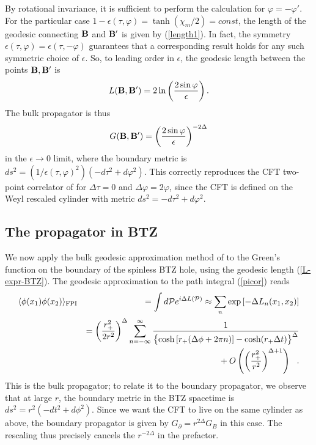 \documentclass[a4paper,12pt]{article}
\begin{document}
By rotational invariance, it is sufficient to perform the calculation
for $\varphi = - \varphi'$.  For the particular case $1 -
\epsilon(\tau,\varphi) = \tanh(\chi_m/2) = const$, the length of the
geodesic connecting ${\bf B}$ and ${\bf B}'$ is given by
(\ref{length1}).  In fact, the symmetry $\epsilon(\tau,\varphi) =
\epsilon(\tau,-\varphi)$ guarantees that a corresponding result holds
for any such symmetric choice of $\epsilon$.  So, to leading order in
$\epsilon$, the geodesic length between the points ${\bf B, B'}$ is
% 
\begin{equation} 
L({\bf B},{\bf B'}) = 2 \ln\left(2\sin\varphi \over \epsilon \right).
\label{geodlen} 
\end{equation} 
% 
The bulk propagator is thus
% 
\begin{equation} 
G({\bf B},{\bf B'}) = \left(2 \sin\varphi \over
\epsilon \right)^{-2\Delta}
\label{eqt2} 
\end{equation} 
% 
in the $\epsilon \rightarrow 0$ limit, where the boundary metric is
$ds^2 = (1/\epsilon(\tau,\varphi)^2) ( -d\tau^2 + d\varphi^2)$.  This
correctly reproduces the CFT two-point correlator of \cite{witten} for
$\Delta \tau=0$ and $\Delta \varphi = 2\varphi$, since the CFT is
defined on the Weyl rescaled cylinder with metric $ds^2 = -d\tau^2 +
d\varphi^2$.  

\subsection{The propagator in BTZ}
\label{prop-in-BTZ}

We now apply the bulk geodesic approximation method of \cite{holopart}
to the Green's function on the boundary of the spinless BTZ hole,
using the geodesic length (\ref{L-expr-BTZ}). The geodesic
approximation to the path integral (\ref{picor}) reads
\begin{eqnarray}
\langle \phi (x_1) \phi(x_2) \rangle_{\rm FPI} 
&&= \int d{\cal P} e^{i
\Delta L({\cal P})}
\approx 
\sum_n\exp\left[-\Delta L_n(x_1,x_2)\right]
\nonumber
\\
&&=
\left(\frac{r_+^2}{2 r^2} \right)^\Delta
\sum_{n=-\infty}^{\infty} 
\frac{1}
{
\left\{
\cosh \left[r_+(\Delta \phi+ 2\pi n) \right] - 
\cosh(r_+\Delta t )
\vphantom{A^A_A}
\right\}^\Delta
}
\nonumber
\\
&&
\phantom{xx}
+ 
O\left( \left( \frac{r_+^2}
{r^2} \right)^{\Delta+1}
\right) 
\ \ . 
\label{BTZ-geodapp-expansion} 
\end{eqnarray}
This is the bulk propagator; to relate it to the boundary propagator,
we observe that at large $r$, the boundary metric in the BTZ spacetime
is $ds^2 = r^2 (-dt^2 + d\phi^2)$. Since we want the CFT to live on
the same cylinder as above, the boundary propagator is given by
$G_\partial= r^{2 \Delta} G_B$ in this case. The rescaling thus
precisely cancels the $r^{-2\Delta}$ in the prefactor. 
\end{document}
